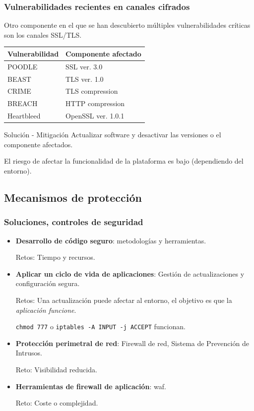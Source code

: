 \begin{frame}[shrink=20]
  \frametitle{Vulnerabilidades recientes en canales cifrados}
  Otro componente en el que se han descubierto múltiples vulnerabilidades críticas son los canales SSL/TLS.
  \begin{center}
    \begin{tabular}{|l|l|}
      \hline
      {\bf Vulnerabilidad}   			& {\bf Componente afectado}\\
      \hline
      POODLE											&   SSL ver. 3.0        \\
      \hline
      BEAST												&   TLS ver. 1.0        \\
      \hline
      CRIME                       &   TLS compression     \\
      \hline
      BREACH                      &   HTTP compression    \\
      \hline
      Heartbleed                  &   OpenSSL ver. 1.0.1  \\
      \hline
    \end{tabular}
  \end{center}
  \begin{block}{Solución - Mitigación}
    Actualizar software y desactivar las versiones o el componente afectados.
    \par El riesgo de afectar la funcionalidad de la plataforma es bajo (dependiendo del entorno).
  \end{block}
\end{frame}

\subsection{Mecanismos de protección}
\begin{frame}[shrink]
  \frametitle{Soluciones, controles de seguridad}
  \begin{itemize}
    \item {\bf Desarrollo de código seguro}: metodologías y herramientas.
      \par Retos: Tiempo y recursos.
    \item {\bf Aplicar un ciclo de vida de aplicaciones}: Gestión de actualizaciones y configuración segura.
      \par Retos: Una actualización puede afectar al entorno, el objetivo es que la {\em aplicación funcione}.
      \par \lstinline{chmod 777} o \lstinline{iptables -A INPUT -j ACCEPT} funcionan.
    \item {\bf Protección perimetral de red}: Firewall de red, Sistema de Prevención de Intrusos.
      \par Reto: Visibilidad reducida.
    \item {\bf Herramientas de firewall de aplicación}: \acrshort{waf}.
      \par Reto: Coste o complejidad.
  \end{itemize}
\end{frame}

